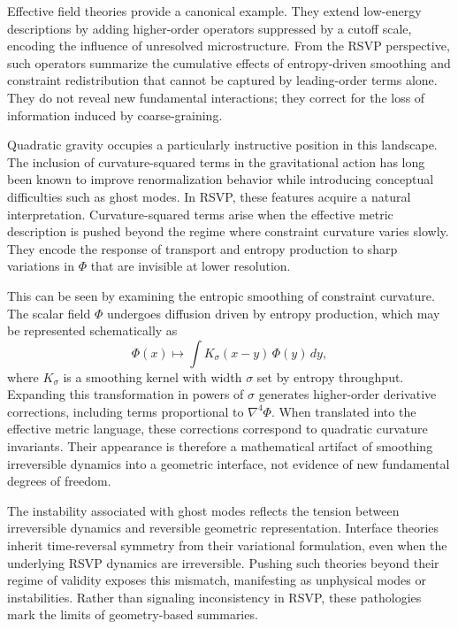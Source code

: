 \documentclass[11pt]{article}
\begin{document}
Effective field theories provide a canonical example. They extend low-energy descriptions by adding higher-order operators suppressed by a cutoff scale, encoding the influence of unresolved microstructure. From the RSVP perspective, such operators summarize the cumulative effects of entropy-driven smoothing and constraint redistribution that cannot be captured by leading-order terms alone. They do not reveal new fundamental interactions; they correct for the loss of information induced by coarse-graining.

Quadratic gravity occupies a particularly instructive position in this landscape. The inclusion of curvature-squared terms in the gravitational action has long been known to improve renormalization behavior while introducing conceptual difficulties such as ghost modes. In RSVP, these features acquire a natural interpretation. Curvature-squared terms arise when the effective metric description is pushed beyond the regime where constraint curvature varies slowly. They encode the response of transport and entropy production to sharp variations in $\Phi$ that are invisible at lower resolution.

This can be seen by examining the entropic smoothing of constraint curvature. The scalar field $\Phi$ undergoes diffusion driven by entropy production, which may be represented schematically as
\begin{equation}
\Phi(x) \mapsto \int K_\sigma(x - y)\, \Phi(y)\, dy,
\end{equation}
where $K_\sigma$ is a smoothing kernel with width $\sigma$ set by entropy throughput. Expanding this transformation in powers of $\sigma$ generates higher-order derivative corrections, including terms proportional to $\nabla^4 \Phi$. When translated into the effective metric language, these corrections correspond to quadratic curvature invariants. Their appearance is therefore a mathematical artifact of smoothing irreversible dynamics into a geometric interface, not evidence of new fundamental degrees of freedom.

The instability associated with ghost modes reflects the tension between irreversible dynamics and reversible geometric representation. Interface theories inherit time-reversal symmetry from their variational formulation, even when the underlying RSVP dynamics are irreversible. Pushing such theories beyond their regime of validity exposes this mismatch, manifesting as unphysical modes or instabilities. Rather than signaling inconsistency in RSVP, these pathologies mark the limits of geometry-based summaries.
\end{document}
